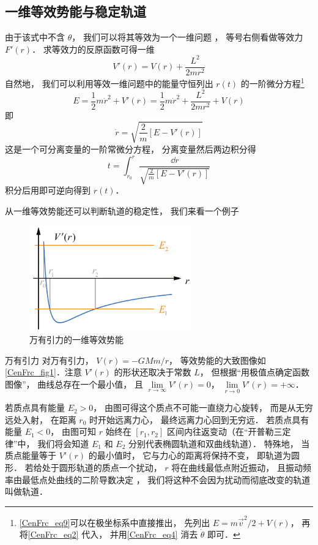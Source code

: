 \subsection{一维等效势能与稳定轨道}
由于该式中不含 $\theta$， 我们可以将其等效为一个一维问题%
， 等号右侧看做等效力 $F'(r)$． 求等效力的反原函数可得一维
\begin{equation}
V'(r) = V(r) + \frac{L^2}{2mr^2}
\end{equation}
自然地， 我们可以利用等效一维问题中的能量守恒列出 $r(t)$ 的一阶微分方程\footnote{\autoref{CenFrc_eq9}可以在极坐标系中直接推出， 先列出 $E = m\vec v^2/2 + V(r)$， 再将\autoref{CenFrc_eq2} 代入， 并用\autoref{CenFrc_eq4} 消去 $\dot\theta$ 即可．}
\begin{equation}\label{CenFrc_eq9}
E = \frac 12 m\dot r^2 + V'(r) = \frac 12 m\dot r^2 + \frac{L^2}{2mr^2} + V(r)
\end{equation}
即
\begin{equation}
\dot r = \sqrt{\frac 2m [E - V'(r)]}
\end{equation}
这是一个可分离变量的一阶常微分方程， %
分离变量然后两边积分得
\begin{equation}
t = \int_{r_0}^{r} \frac{\dd{r}}{\sqrt{\frac 2m [E - V'(r)]}}
\end{equation}
积分后用即可逆向得到 $r(t)$．

从一维等效势能还可以判断轨道的稳定性， 我们来看一个例子

\begin{figure}[ht]
\centering
\includegraphics[width=7cm]{./figures/CenFrc1.pdf}
\caption{万有引力的一维等效势能} \label{CenFrc_fig1}
\end{figure}

\begin{exam}{万有引力}
对万有引力， $V(r) = -GMm/r$， 等效势能的大致图像如\autoref{CenFrc_fig1}．注意 $V'(r)$ 的形状还取决于常数 $L$， 但根据“用极值点确定函数图像”， 曲线总存在一个最小值， 且 $\lim\limits_{r\to\infty}V'(r) = 0$， $\lim\limits_{r\to 0} V'(r) = +\infty$．

若质点具有能量 $E_2 > 0$， 由图可得这个质点不可能一直绕力心旋转， 而是从无穷远处入射， 在距离 $r_0$ 时开始远离力心， 最终远离力心回到无穷远． 若质点具有能量 $E_1 < 0$， 由图可知 $r$ 始终在 $[r_1, r_2]$ 区间内往返变动（在“开普勒三定律”中， 我们将会知道 $E_1$ 和 $E_2$ 分别代表椭圆轨道和双曲线轨道）． 特殊地， 当质点能量等于 $V'(r)$ 的最小值时， 它与力心的距离将保持不变， 即轨道为圆形． 若给处于圆形轨道的质点一个扰动， $r$ 将在曲线最低点附近振动， 且振动频率由最低点处曲线的二阶导数决定%
， 我们将这种不会因为扰动而彻底改变的轨道叫做轨道．
\end{exam}

